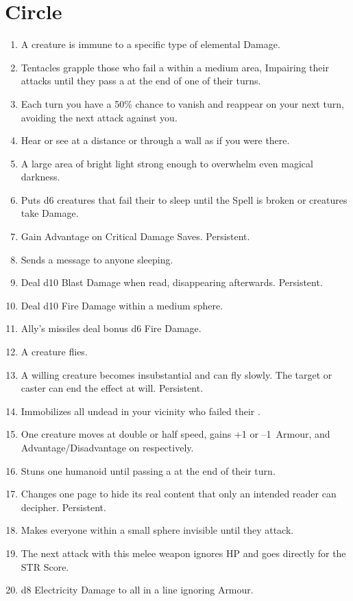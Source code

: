 \documentclass[itdr]{subfiles}
\begin{document}
\vfill
\break

\section{ Circle}
\def \spellcircle {3}
\begin{enumerate}
	\item {} A creature is immune to a specific type of elemental Damage.
	\item {} Tentacles grapple those who fail a  within a medium area, Impairing their attacks until they pass a  at the end of one of their turns.
	\item {} Each turn you have a 50\% chance to vanish and reappear on your next turn, avoiding the next attack against you.
	\item {} Hear or see at a distance or through a wall as if you were there.
	\item {} A large area of bright light strong enough to overwhelm even magical darkness.
	\item {} Puts d6 creatures that fail their  to sleep until the Spell is broken or creatures take Damage.
	\item {} Gain Advantage on Critical Damage Saves. Persistent.
	\item {} Sends a message to anyone sleeping.
	\item {} Deal d10 Blast Damage when read, disappearing afterwards. Persistent.
	\item {} Deal d10 Fire Damage within a medium sphere.
	\item {} Ally's missiles deal bonus d6 Fire Damage.
	\item {} A creature flies.
	\item {} A willing creature becomes \mbox{insubstantial} and can fly slowly. The target or caster can end the effect at will. Persistent.
	\item {} Immobilizes all undead in your vicinity who failed their .
	\item {} One creature moves at double or half speed, gains +1 or --1~Armour, and Advantage/Disadvantage on  respectively.
	\item {} Stuns one humanoid until passing a  at the end of their turn.
	\item {} Changes one page to hide its real content that only an intended reader can decipher. Persistent.
	\item {} Makes everyone within a small sphere invisible until they attack.
	\item {} The next attack with this melee weapon ignores HP and goes directly for the STR Score.
	\item {} d8 Electricity Damage to all in a line ignoring Armour.


\end{enumerate}
\end{document}
